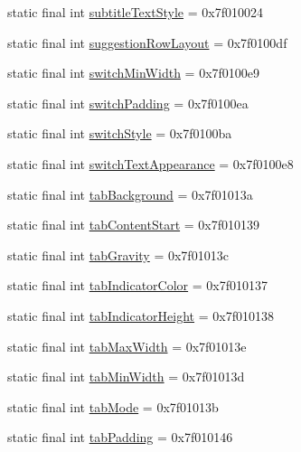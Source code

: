 \begin{CompactItemize}
static final int \hyperlink{classandroid_1_1support_1_1v4_1_1_r_1_1attr_1f8ded42abf93cc99194c13d0690dbb7}{subtitleTextStyle} = 0x7f010024
\item 
static final int \hyperlink{classandroid_1_1support_1_1v4_1_1_r_1_1attr_6718d46cc2a84e65a419df73830133ab}{suggestionRowLayout} = 0x7f0100df
\item 
static final int \hyperlink{classandroid_1_1support_1_1v4_1_1_r_1_1attr_f25d67885698da9df9803f1ef3eb9736}{switchMinWidth} = 0x7f0100e9
\item 
static final int \hyperlink{classandroid_1_1support_1_1v4_1_1_r_1_1attr_052fde5b4a32a8ac7abe1775ec469774}{switchPadding} = 0x7f0100ea
\item 
static final int \hyperlink{classandroid_1_1support_1_1v4_1_1_r_1_1attr_a11b0636da523d0daef331a39b6d54de}{switchStyle} = 0x7f0100ba
\item 
static final int \hyperlink{classandroid_1_1support_1_1v4_1_1_r_1_1attr_834dd0b00a0bf0eec4af628cb19fcc84}{switchTextAppearance} = 0x7f0100e8
\item 
static final int \hyperlink{classandroid_1_1support_1_1v4_1_1_r_1_1attr_5b9a90e4628861819ccf24233f61637c}{tabBackground} = 0x7f01013a
\item 
static final int \hyperlink{classandroid_1_1support_1_1v4_1_1_r_1_1attr_1b24561cfe52c9ee5c3adf2364094147}{tabContentStart} = 0x7f010139
\item 
static final int \hyperlink{classandroid_1_1support_1_1v4_1_1_r_1_1attr_4676d130566eff9e8d21cfe178fd2c85}{tabGravity} = 0x7f01013c
\item 
static final int \hyperlink{classandroid_1_1support_1_1v4_1_1_r_1_1attr_c501a59bd797044d69635ab0c45e1bca}{tabIndicatorColor} = 0x7f010137
\item 
static final int \hyperlink{classandroid_1_1support_1_1v4_1_1_r_1_1attr_10a3133b861d6ea01189632792d41cbe}{tabIndicatorHeight} = 0x7f010138
\item 
static final int \hyperlink{classandroid_1_1support_1_1v4_1_1_r_1_1attr_d81cd4f4c0595cd4b23f0823af70ebb6}{tabMaxWidth} = 0x7f01013e
\item 
static final int \hyperlink{classandroid_1_1support_1_1v4_1_1_r_1_1attr_ae07f6d6023cfa3800dd0f68c48ffbfa}{tabMinWidth} = 0x7f01013d
\item 
static final int \hyperlink{classandroid_1_1support_1_1v4_1_1_r_1_1attr_fdc60806c7b1b6fec8cb86d425dd3125}{tabMode} = 0x7f01013b
\item 
static final int \hyperlink{classandroid_1_1support_1_1v4_1_1_r_1_1attr_86d1c72c198fed5b36bcaf128024eba6}{tabPadding} = 0x7f010146

\end{CompactItemize}
